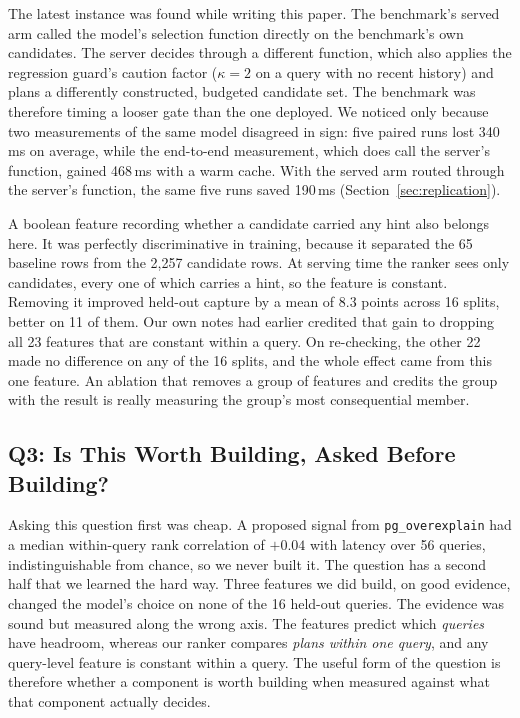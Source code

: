 \documentclass[conference]{IEEEtran}
\begin{document}
The latest instance was found while writing this paper. The benchmark's served
arm called the model's selection function directly on the benchmark's own
candidates. The server decides through a different function, which also
applies the regression guard's caution factor ($\kappa = 2$ on a query with no
recent history) and plans a differently constructed, budgeted candidate set.
The benchmark was therefore timing a looser gate than the one deployed. We
noticed only because two measurements of the same model disagreed in sign:
five paired runs lost 340\,ms on average, while the end-to-end measurement,
which does call the server's function, gained 468\,ms with a warm cache. With
the served arm routed through the server's function, the same five runs saved
190\,ms (Section~\ref{sec:replication}).

A boolean feature recording whether a candidate carried any hint also belongs
here. It was perfectly discriminative in training, because it separated the 65
baseline rows from the 2,257 candidate rows. At serving time the ranker sees
only candidates, every one of which carries a hint, so the feature is constant. Removing it improved held-out capture by a mean of 8.3 points
across 16 splits, better on 11 of them. Our own notes had earlier credited that
gain to dropping all 23 features that are constant within a query. On
re-checking, the other 22 made no difference on any of the 16 splits, and the
whole effect came from this one feature. An ablation that removes a group of
features and credits the group with the result is really measuring the group's
most consequential member.

\subsection{Q3: Is This Worth Building, Asked Before Building?}
\label{sec:q3}

Asking this question first was cheap. A proposed signal from
\texttt{pg\_overexplain} had a median within-query rank correlation of $+0.04$
with latency over 56 queries, indistinguishable from chance, so we never built
it. The question has a second half that we learned the hard way. Three features we
did build, on good evidence, changed the model's choice on none of the 16
held-out queries. The evidence was sound but measured along the wrong axis. The
features predict which \emph{queries} have headroom, whereas our ranker compares
\emph{plans within one query}, and any query-level feature is constant within a
query. The useful form of the question is therefore whether a component is worth
building when measured against what that component actually decides.
\end{document}

